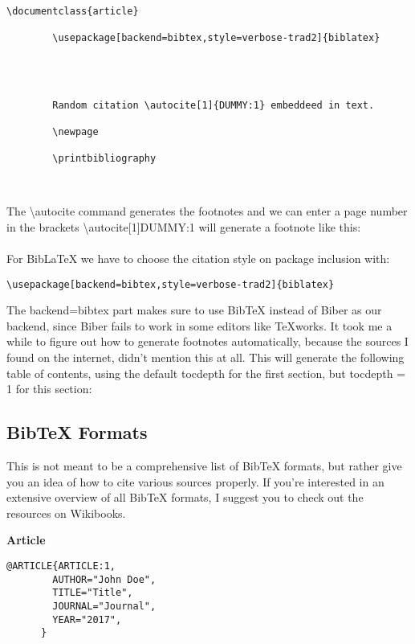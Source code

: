       \begin{lstlisting}[language={[LaTeX]TeX}, breaklines=true,frame=single]
        \documentclass{article}

        \usepackage[backend=bibtex,style=verbose-trad2]{biblatex}
         
        
        
        
        Random citation \autocite[1]{DUMMY:1} embeddeed in text.
        
        \newpage
        
        \printbibliography
        
        
    \end{lstlisting}

    The \textbackslash autocite command generates the footnotes 
    and we can enter a page number in the brackets 
    \textbackslash autocite[1]{DUMMY:1} will generate 
    a footnote like this:

    \paragraph{}
    For BibLaTeX we have to choose the citation style on package inclusion with:
    
    \begin{lstlisting}[language={[LaTeX]TeX}, breaklines=true,frame=single]
      \usepackage[backend=bibtex,style=verbose-trad2]{biblatex}
    \end{lstlisting}

    The backend=bibtex part makes sure to use BibTeX instead of 
    Biber as our backend, since Biber fails to work in some 
    editors like TeXworks. It took me a while to figure out 
    how to generate footnotes automatically, because the sources 
    I found on the internet, didn't mention this at all.
     This will generate the following table of contents,
      using the default tocdepth for the first section, 
      but tocdepth = 1 for this section:


  \subsection{BibTeX Formats}
    This is not meant to be a comprehensive list of BibTeX formats, but rather give you an idea of how to cite various sources properly. If you're interested in an extensive overview of all BibTeX formats, I suggest you to check out the resources on Wikibooks.
    
    \textbf{Article}
    \begin{lstlisting}[language={[LaTeX]TeX}, breaklines=true,frame=single]
      @ARTICLE{ARTICLE:1,
        AUTHOR="John Doe",
        TITLE="Title",
        JOURNAL="Journal",
        YEAR="2017",
      }
    \end{lstlisting}
 
